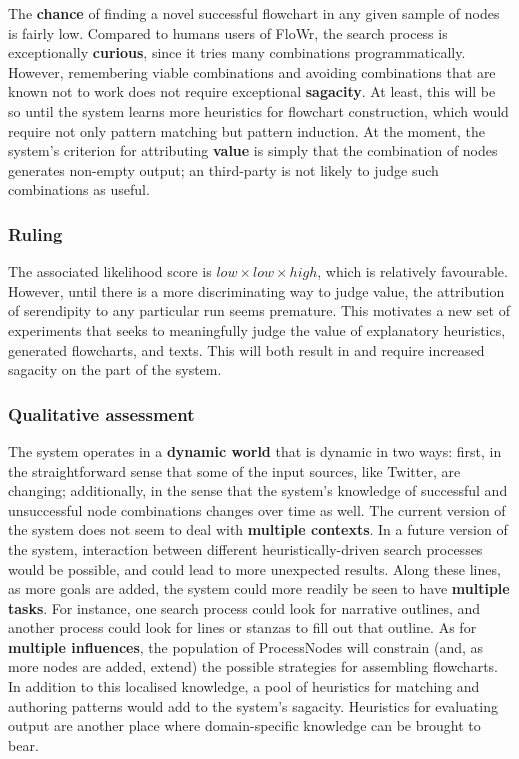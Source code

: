 The \textbf{chance} of finding a novel successful flowchart in any
given sample of nodes is fairly low.  Compared to humans users of {\sf
  FloWr}, the search process is exceptionally \textbf{curious}, since
it tries many combinations programmatically.  However, remembering
viable combinations and avoiding combinations that are known not to
work does not require exceptional \textbf{sagacity}.  At least, this will be
so until the system learns more heuristics for flowchart construction, which would
require not only pattern matching but pattern induction.  At the moment, the
system's criterion for attributing \textbf{value} is simply that the combination
of nodes generates non-empty output; an third-party is not likely to judge such
combinations as useful.

\subsubsection{Ruling}

The associated likelihood score is
$\mathit{low}\times\mathit{low}\times\mathit{high}$, which is
relatively favourable.  However, until there is a more discriminating
way to judge value, the attribution of serendipity to any particular
run seems premature.  This motivates a new set of experiments that
seeks to meaningfully judge the value of explanatory heuristics, generated
flowcharts, and texts.  This will both result in and require increased
sagacity on the part of the system.

\subsubsection{Qualitative assessment}

The system operates in a \textbf{dynamic world} that is dynamic in two
ways: first, in the straightforward sense that some of the input
sources, like Twitter, are changing; additionally, in the sense that
the system's knowledge of successful and unsuccessful node
combinations changes over time as well.  The current version of the system
does not seem to deal with \textbf{multiple contexts}.  In a future version of the system,
interaction between different heuristically-driven search processes
would be possible, and could lead to more unexpected results.  Along
these lines, as more goals are added, the system could more readily be
seen to have \textbf{multiple tasks}.  For instance, one search
process could look for narrative outlines, and another process could
look for lines or stanzas to fill out that outline.  As for
\textbf{multiple influences}, the population of ProcessNodes will
constrain (and, as more nodes are added, extend) the possible
strategies for assembling flowcharts.  In addition to this localised
knowledge, a pool of heuristics for matching and authoring patterns
would add to the system's sagacity.  Heuristics for evaluating output
are another place where domain-specific knowledge can be brought to
bear.

